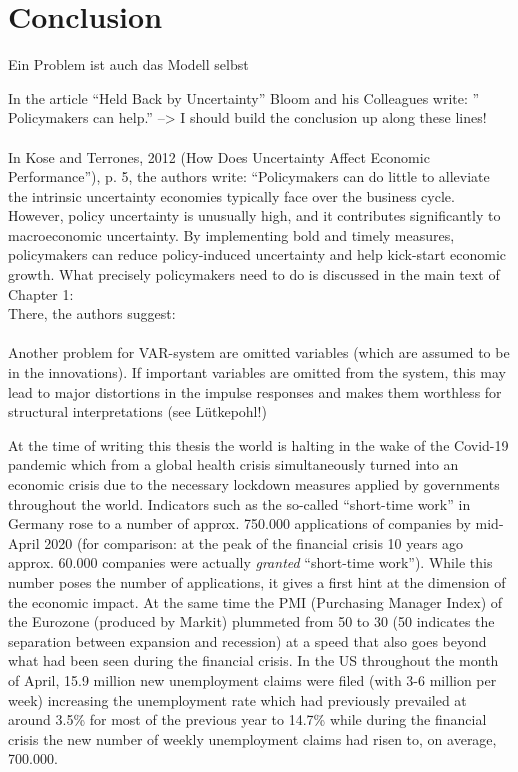 \documentclass[a4paper,11pt,listof=nochaptergap,oneside,pointednumbers,bibtotoc,bigheadings,liststotoc]{scrbook}
\theoremstyle{mysatz}
\theoremstyle{mydefinition}
\theoremstyle{mytheorem}
\theoremstyle{mybemerkung}
\begin{document}
\chapter{Conclusion}
\label{Conclusion}

Ein Problem ist auch das Modell selbst


In the article ``Held Back by Uncertainty'' Bloom and his Colleagues write: '' Policymakers can help.'' --> I should build the conclusion up along these lines! \\
\\
In Kose and Terrones, 2012 (How Does Uncertainty Affect Economic Performance''), p. 5, the authors write: ``Policymakers can do little to alleviate the intrinsic uncertainty economies typically face over the business cycle. However, policy uncertainty is unusually high, and it contributes significantly to macroeconomic uncertainty. By implementing bold and timely measures, policymakers can reduce policy-induced uncertainty and help kick-start economic growth. What precisely policymakers need to do is discussed in the main text of Chapter 1:\\
There, the authors suggest: 
\\
\\
Another problem for VAR-system are omitted variables (which are assumed to be in the innovations). If important variables are omitted from the system, this may lead to major distortions in the impulse responses and makes them worthless for structural interpretations (see Lütkepohl!)

At the time of writing this thesis the world is halting in the wake of the Covid-19 pandemic which from a global health crisis simultaneously turned into an economic crisis due to the necessary lockdown measures applied by governments throughout the world. Indicators such as the so-called ``short-time work'' in Germany rose to a number of approx. 750.000 applications of companies by mid-April 2020 (for comparison: at the peak of the financial crisis 10 years ago approx. 60.000 companies were actually \textit{granted} ``short-time work''). While this number poses the number of applications, it gives a first hint at the dimension of the economic impact. At the same time the PMI (Purchasing Manager Index) of the Eurozone (produced by Markit) plummeted from 50 to 30 (50 indicates the separation between expansion and recession) at a speed that also goes beyond what had been seen during the financial crisis. In the US throughout the month of April, 15.9 million new unemployment claims were filed (with 3-6 million per week) increasing the unemployment rate which had previously prevailed at around 3.5\% for most of the previous year to 14.7\% while during the financial crisis the new number of weekly unemployment claims had risen to, on average, 700.000.
\end{document}
